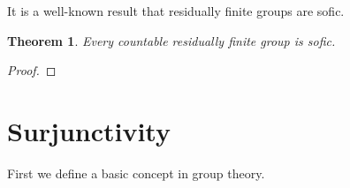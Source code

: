 \documentclass[titlepage, a4paper]{article}
\newcommand{\Z}{\mathbb{Z}}
\DeclareMathOperator{\sym}{Sym}
\theoremstyle{theoremdd}
\newtheorem{theorem}{Theorem}[section]
\theoremstyle{definition}
\theoremstyle{remark}
\begin{document}
It is a well-known result that residually finite groups are sofic. %

    \begin{theorem} \label{thm:res_fin_sofic}
        Every countable residually finite group is sofic.
    \end{theorem}
    \begin{proof}
        
    \end{proof}




 

    \section{Surjunctivity}\label{sec:surjunctivity}

    First we define a basic concept in group theory.
\end{document}
